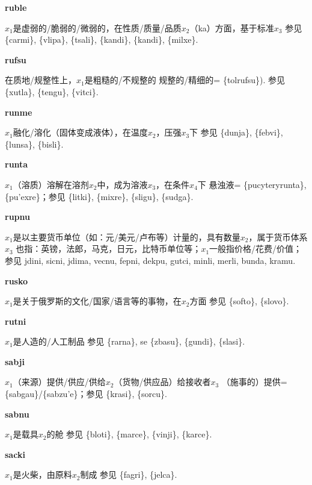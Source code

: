 \documentclass[notitlepage,twocolumn,a4paper,10pt]{book}
\begin{document}
{\sffamily\bfseries ruble}  $x_1$是虚弱的\slash{}脆弱的\slash{}微弱的，在性质\slash{}质量\slash{}品质$x_2$（ka）方面，基于标准$x_3$ \textemdash{} 参见 \{carmi\}, \{vlipa\}, \{tsali\}, \{kandi\}, \{kandi\}, \{milxe\}.

{\sffamily\bfseries rufsu}\enspace {\ttfamily\bfseries[ruf]}  在质地\slash{}规整性上，$x_1$是粗糙的\slash{}不规整的 \textemdash{} 规整的\slash{}精细的= \{tolrufsu\}). 参见 \{xutla\}, \{tengu\}, \{vitci\}.

{\sffamily\bfseries runme}\enspace {\ttfamily\bfseries[rum]}  $x_1$融化\slash{}溶化（固体变成液体），在温度$x_2$，压强$x_3$下 \textemdash{} 参见 \{dunja\}, \{febvi\}, \{lunsa\}, \{bisli\}.

{\sffamily\bfseries runta} $x_1$（溶质）溶解在溶剂$x_2$中，成为溶液$x_3$，在条件$x_4$下 \textemdash{} 悬浊液= \{pucyteryrunta\}, \{pu'exre\}；参见 \{litki\}, \{mixre\}, \{sligu\}, \{sudga\}.

{\sffamily\bfseries rupnu}\enspace {\ttfamily\bfseries[rup     ru'u]}  $x_1$是以主要货币单位（如：元\slash{}美元\slash{}卢布等）计量的，具有数量$x_2$，属于货币体系$x_3$ \textemdash{} 也指：英镑，法郎，马克，日元，比特币单位等；$x_1$一般指价格\slash{}花费\slash{}价值；参见 {jdini}, {sicni}, {jdima}, {vecnu}, {fepni}, {dekpu}, {gutci}, {minli}, {merli}, {bunda}, {kramu}.

{\sffamily\bfseries rusko}\enspace {\ttfamily\bfseries[ruk     ru'o]}  $x_1$是关于俄罗斯的文化\slash{}国家\slash{}语言等的事物，在$x_2$方面 \textemdash{} 参见 \{softo\}, \{slovo\}.

{\sffamily\bfseries rutni}\enspace {\ttfamily\bfseries[run]}  $x_1$是人造的\slash{}人工制品 \textemdash{} 参见 \{rarna\}, se \{zbasu\}, \{gundi\}, \{slasi\}.

{\sffamily\bfseries sabji}\enspace {\ttfamily\bfseries[sab]}  $x_1$（来源）提供\slash{}供应\slash{}供给$x_2$（货物\slash{}供应品）给接收者$x_3$ \textemdash{} （施事的）提供=\{sabgau\}\slash{}\{sabzu'e\}；参见 \{krasi\}, \{sorcu\}.

{\sffamily\bfseries sabnu} $x_1$是载具$x_2$的舱 \textemdash{} 参见 \{bloti\}, \{marce\}, \{vinji\}, \{karce\}.

{\sffamily\bfseries sacki} $x_1$是火柴，由原料$x_2$制成 \textemdash{} 参见 \{fagri\}, \{jelca\}.
\end{document}
